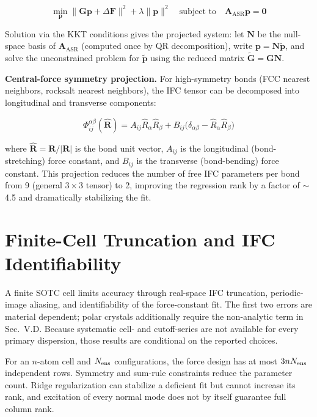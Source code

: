 \documentclass[aps,prb,reprint,amsmath,amssymb,floatfix]{revtex4-2}
\begin{document}
\color{revisionblue}
\begin{equation*}
\min_\mathbf{p}\|\mathbf{G}\mathbf{p}+\Delta\mathbf{F}\|^2
+\lambda\|\mathbf{p}\|^2
\quad\text{subject to}\quad
\mathbf{A}_\text{ASR}\mathbf{p}=\mathbf{0}
\end{equation*}
\color{black}

Solution via the KKT conditions gives the projected system: let
\(\mathbf{N}\) be the null-space basis of \(\mathbf{A}_\text{ASR}\)
(computed once by QR decomposition), write
\(\mathbf{p} = \mathbf{N}\tilde{\mathbf{p}}\), and solve the
unconstrained problem for \(\tilde{\mathbf{p}}\) using the reduced
matrix \(\tilde{\mathbf{G}} = \mathbf{G}\mathbf{N}\).

\textbf{Central-force symmetry projection.} For high-symmetry bonds (FCC
nearest neighbors, rocksalt nearest neighbors), the IFC tensor can be
decomposed into longitudinal and transverse components:

\begin{equation*}
\Phi_{ij}^{\alpha\beta}(\hat{\mathbf{R}}) = A_{ij}\hat{R}_\alpha\hat{R}_\beta + B_{ij}\bigl(\delta_{\alpha\beta} - \hat{R}_\alpha\hat{R}_\beta\bigr)
\end{equation*}

where \(\hat{\mathbf{R}} = \mathbf{R}/|\mathbf{R}|\) is the bond unit
vector, \(A_{ij}\) is the longitudinal (bond-stretching) force constant,
and \(B_{ij}\) is the transverse (bond-bending) force constant. This
projection reduces the number of free IFC parameters per bond from 9
(general \(3\times3\) tensor) to 2, improving the regression rank by a
factor of $\sim$4.5 and dramatically stabilizing the fit.

\color{revisionblue}
\section{Finite-Cell Truncation and IFC Identifiability}
\label{appendix-e-finite-cell-truncation-and-ifc-identifiability}
\color{black}

\color{revisionblue}
A finite SOTC cell limits accuracy through real-space IFC truncation,
periodic-image aliasing, and identifiability of the force-constant fit. The
first two errors are material dependent; polar crystals additionally require
the non-analytic term in Sec.~V.D. Because systematic cell- and cutoff-series
are not available for every primary dispersion, those results are conditional
on the reported choices.
\color{black}

\color{revisionblue}
For an \(n\)-atom cell and \(N_{\rm ens}\) configurations, the force design has
at most \(3nN_{\rm ens}\) independent rows. Symmetry and sum-rule constraints
reduce the parameter count. Ridge regularization can stabilize a deficient fit
but cannot increase its rank, and excitation of every normal mode does not by
itself guarantee full column rank.
\color{black}
\end{document}
